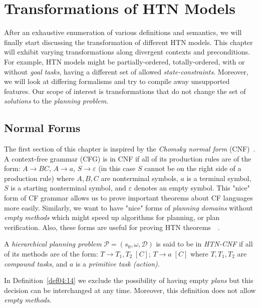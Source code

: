 \chapter{Transformations of {HTN} {M}odels}

\medskip\noindent
After an exhaustive enumeration of various definitions and semantics, we will finally start discussing the transformation of different HTN models. This chapter will exhibit varying transformations along divergent contexts and preconditions. For example, HTN models might be partially-ordered, totally-ordered, with or without \emph{goal tasks}, having a different set of allowed \emph{state-constraints}. Moreover, we will look at differing formalisms and try to compile away unsupported features. Our scope of interest is transformations that do not change the set of \emph{solutions} to the \emph{planning problem}.

\section{Normal Forms}

\medskip\noindent
The first section of this chapter is inspired by the \emph{Chomsky normal form} (CNF)~\cite{chytil}. A context-free grammar (CFG) is in CNF if all of its production rules are of the form: $A \rightarrow BC$, $A \rightarrow a$, $S \rightarrow \varepsilon$ (in this case $S$ cannot be on the right side of a production rule) where $A, B, C$ are nonterminal symbols, $a$ is a terminal symbol, $S$ is a starting nonterminal symbol, and $\varepsilon$ denotes an empty symbol. This "nice" form of CF grammar allows us to prove important theorems about CF languages more easily. Similarly, we want to have "nice" forms of \emph{planning domains} without \emph{empty methods} which might speed up algorithms for planning, or plan verification. Also, these forms are useful for proving HTN theorems~\cite{langclassification}~\cite{cmyk}.

\begin{defn}\label{def04:14}
    A \emph{hierarchical planning problem} $\mathcal{P} = (s_0,\omega,\mathcal{D})$ is said to be in \emph{HTN-CNF} if all of its methods are of the form: $T \rightarrow T_1, T_2 \; [C]$; $T \rightarrow a \; [C]$ where $T, T_1, T_2$ are \emph{compound tasks}, and $a$ is a \emph{primitive task (action)}. 
\end{defn}

\medskip\noindent
In Definition~\ref{def04:14} we exclude the possibility of having empty \emph{plans} but this decision can be interchanged at any time. Moreover, this definition does not allow \emph{empty methods}.

